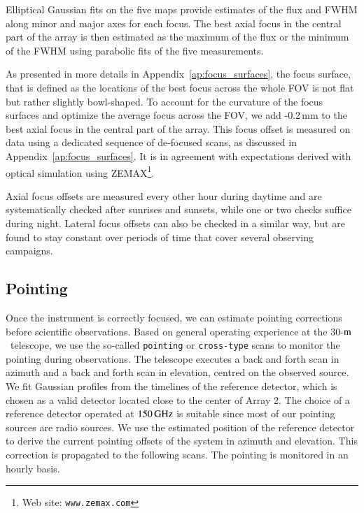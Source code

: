 \documentclass[traditionalabstract]{aa}
\newcommand{\trentemetre}{30-$\rm{m}$}
\newcommand{\lp}[1]{#1}
\begin{document}
Elliptical Gaussian fits on the five maps provide estimates of
the flux and FWHM along minor and major axes for each focus. 
The best axial focus in the central part of the array is then
estimated as the maximum of the flux or the minimum of the FWHM using
parabolic fits of the five measurements.

As presented in more details in Appendix~\ref{ap:focus_surfaces}, the focus
surface, that is defined as the locations of the best focus across the whole FOV
is not flat but rather slightly bowl-shaped.
To account for the curvature of the focus surfaces and optimize the
average focus across the FOV, we add -0.2\,mm to the best axial focus
in the central part of the array. This focus offset is measured on data using
a dedicated sequence of de-focused scans, as discussed in
Appendix~\ref{ap:focus_surfaces}. It is in agreement with expectations
derived with optical simulation using ZEMAX\footnote{Web site: \tt{www.zemax.com}}. 

{\lp Axial focus offsets are measured every other hour during daytime and
are systematically checked after sunrises and sunsets, while one or
two checks suffice during night. 
Lateral focus offsets can also be checked in a similar way, but are
found to stay constant over periods of time that cover several
observing campaigns.}


\subsection{Pointing}
\label{se:pointing}

Once the instrument is correctly focused, we can estimate pointing corrections
before scientific observations.
Based on general operating experience at the \trentemetre\ telescope, we use the so-called
{\tt pointing} or {\tt cross-type} scans to monitor the pointing during observations. The
telescope executes a back and forth scan in azimuth and a back and forth scan in
elevation, centred on the observed source. We fit Gaussian profiles
from the timelines of the reference detector, which is chosen as a
valid detector located close to the center of Array 2. {The choice of
a reference detector operated at $150\,\rm{GHz}$ is suitable since most
of our pointing sources are radio sources.} We use the
estimated position of the reference detector to derive the current pointing
offsets of the system in azimuth and elevation. This correction is
propagated to the following scans. The pointing is monitored in an
hourly basis.
\end{document}
